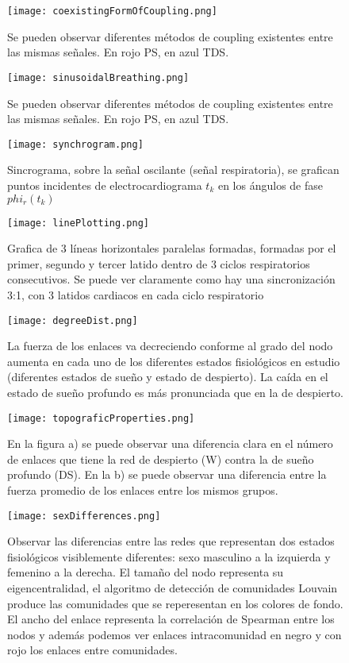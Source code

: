 \documentclass[twoside,twocolumn]{article}
\begin{document}
\renewcommand\refname{Referencias}
\printbibliography
\begin{figure}
  \texttt{[image: coexistingFormOfCoupling.png]}
  \caption{Se pueden observar diferentes métodos de coupling existentes entre las mismas señales. En rojo PS, en azul TDS.}
  \label{fig:coexistingFormOfCoupling}
\end{figure}
\begin{figure}
  \texttt{[image: sinusoidalBreathing.png]}
  \caption{Se pueden observar diferentes métodos de coupling existentes entre las mismas señales. En rojo PS, en azul TDS.}
  \label{fig:sinusoidalBreathing}
\end{figure}
\begin{figure}
  \texttt{[image: synchrogram.png]}
  \caption{Sincrograma, sobre la señal oscilante (señal respiratoria), se grafican puntos incidentes de electrocardiograma $t_k$ en los ángulos de fase $phi_r(t_k)$}
  \label{fig:synchrogram}
\end{figure}
\begin{figure}
  \texttt{[image: linePlotting.png]}
  \caption{Grafica de 3 líneas horizontales paralelas formadas, formadas por el primer, segundo y tercer latido dentro de 3 ciclos respiratorios consecutivos. Se puede ver claramente como hay una sincronización 3:1, con 3 latidos cardiacos en cada ciclo respiratorio}
  \label{fig:linePlotting}
\end{figure}
\begin{figure}
  \texttt{[image: degreeDist.png]}
  \caption{La fuerza de los enlaces va decreciendo conforme al grado del nodo aumenta en cada uno de los diferentes estados fisiológicos en estudio (diferentes estados de sueño y estado de despierto). La caída en el estado de sueño profundo es más pronunciada que en la de despierto.}
  \label{fig:degreeDist}
\end{figure}
\begin{figure}
  \texttt{[image: topograficProperties.png]}
  \caption{En la figura a) se puede observar una diferencia clara en el número de enlaces que tiene la red de despierto (W) contra la de sueño profundo (DS). En la b) se puede observar una diferencia entre la fuerza promedio de los enlaces entre los mismos grupos.}
  \label{fig:topograficProperties}
\end{figure}
\begin{figure}
  \texttt{[image: sexDifferences.png]}
  \caption{Observar las diferencias entre las redes que representan dos estados fisiológicos visiblemente diferentes: sexo masculino a la izquierda y femenino a la derecha. El tamaño del nodo representa su eigencentralidad, el algoritmo de detección de comunidades Louvain produce las comunidades que se reperesentan en los colores de fondo. El ancho del enlace representa la correlación de Spearman entre los nodos y además podemos ver enlaces intracomunidad en negro y con rojo los enlaces entre comunidades.}
  \label{fig:sexDifferences}
\end{figure}
\end{document}
